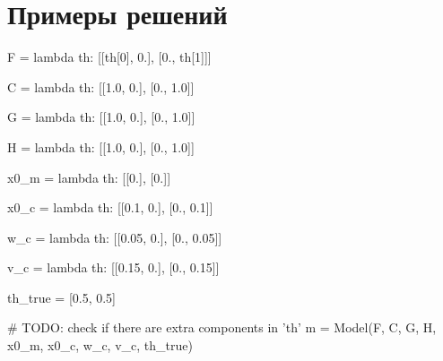 \documentclass[a4paper,14pt]{extarticle}
\begin{document}
\section{Примеры решений}

\begin{pycode}[model1]
F = lambda th: [[th[0], 0.],
                [0., th[1]]]

C = lambda th: [[1.0, 0.],
                [0., 1.0]]

G = lambda th: [[1.0, 0.],
                [0., 1.0]]

H = lambda th: [[1.0, 0.],
                [0., 1.0]]

x0_m = lambda th: [[0.],
                   [0.]]

x0_c = lambda th: [[0.1, 0.],
                   [0., 0.1]]

w_c = lambda th: [[0.05, 0.],
                  [0., 0.05]]

v_c = lambda th: [[0.15, 0.],
                  [0., 0.15]]

th_true = [0.5, 0.5]

# TODO: check if there are extra components in 'th'
m = Model(F, C, G, H, x0_m, x0_c, w_c, v_c, th_true)
\end{pycode}

\end{document}
